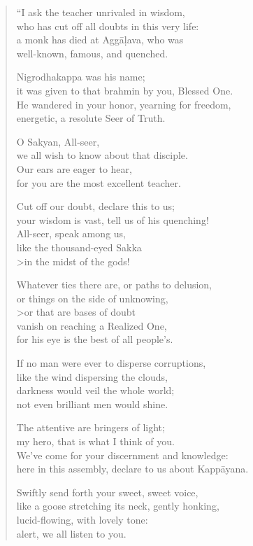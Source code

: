 \documentclass[12pt,openany]{book}%
\begin{document}
\begin{verse}
“I ask the teacher unrivaled in wisdom, \\
who has cut off all doubts in this very life: \\
a monk has died at \textsanskrit{Aggāḷava}, who was \\
well-known, famous, and quenched. 

Nigrodhakappa was his name; \\
it was given to that brahmin by you, Blessed One. \\
He wandered in your honor, yearning for freedom, \\
energetic, a resolute Seer of Truth. 

O Sakyan, All-seer, \\
we all wish to know about that disciple. \\
Our ears are eager to hear, \\
for you are the most excellent teacher. 

Cut off our doubt, declare this to us; \\
your wisdom is vast, tell us of his quenching! \\
All-seer, speak among us, \\
like the thousand-eyed Sakka \\>in the midst of the gods! 

Whatever ties there are, or paths to delusion, \\
or things on the side of unknowing, \\>or that are bases of doubt \\
vanish on reaching a Realized One, \\
for his eye is the best of all people’s. 

If no man were ever to disperse corruptions, \\
like the wind dispersing the clouds, \\
darkness would veil the whole world; \\
not even brilliant men would shine. 

The attentive are bringers of light; \\
my hero, that is what I think of you. \\
We’ve come for your discernment and knowledge: \\
here in this assembly, declare to us about \textsanskrit{Kappāyana}. 

Swiftly send forth your sweet, sweet voice, \\
like a goose stretching its neck, gently honking, \\
lucid-flowing, with lovely tone: \\
alert, we all listen to you. 


\end{verse}
\end{document}
